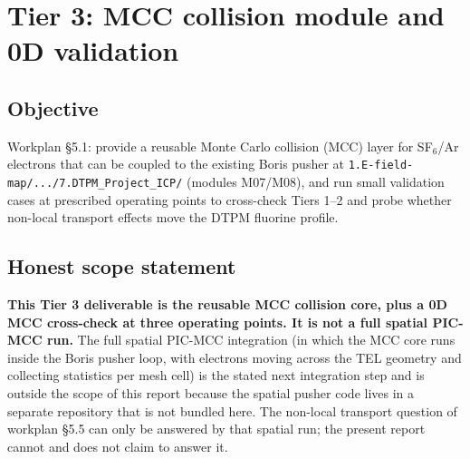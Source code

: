 \documentclass[11pt,a4paper]{article}
\begin{document}
\section{Tier 3: MCC collision module and 0D validation}
\label{sec:tier3}

\subsection{Objective}
Workplan §5.1: provide a reusable Monte Carlo collision (MCC)
layer for SF$_6$/Ar electrons that can be coupled to the
existing Boris pusher at
\texttt{1.E-field-map/.../7.DTPM\_Project\_ICP/} (modules
M07/M08), and run small validation cases at prescribed
operating points to cross-check Tiers 1--2 and probe whether
non-local transport effects move the DTPM fluorine profile.

\subsection{Honest scope statement}
\textbf{This Tier 3 deliverable is the reusable MCC collision
core, plus a 0D MCC cross-check at three operating points. It is
not a full spatial PIC-MCC run.} The full spatial PIC-MCC
integration (in which the MCC core runs inside the Boris pusher
loop, with electrons moving across the TEL geometry and
collecting statistics per mesh cell) is the stated next
integration step and is outside the scope of this report
because the spatial pusher code lives in a separate repository
that is not bundled here. The non-local transport question of
workplan §5.5 can only be answered by that spatial run; the
present report cannot and does not claim to answer it.
\end{document}
